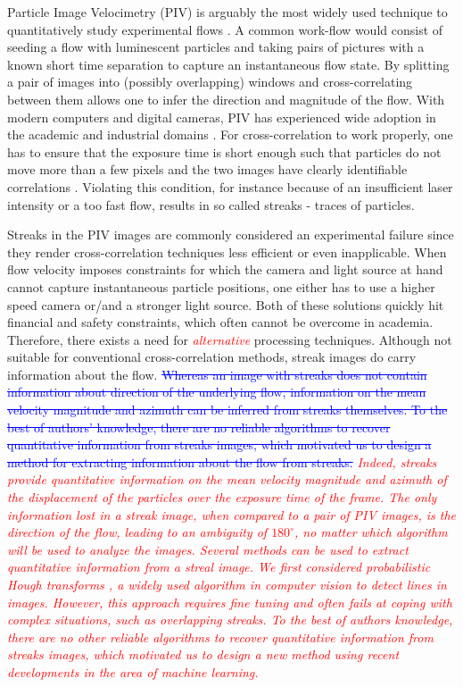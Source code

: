 \documentclass{svjour3}                     %
\newcommand{\new}[1]{\textit{\textcolor{red}{#1}}}
\newcommand{\old}[1]{\textcolor{blue}{\sout{#1}}}
\begin{document}
Particle Image Velocimetry (PIV) is arguably the most widely used technique to quantitatively study experimental flows \cite{westerweel1997fundamentals, raffel2018particle}. A common work-flow would consist of seeding a flow with luminescent particles and taking pairs of pictures with a known short time separation to capture an instantaneous flow state. By splitting a pair of images into (possibly overlapping) windows and cross-correlating between them allows one to infer the direction and magnitude of the flow. With modern computers and digital cameras, PIV has experienced wide adoption in the academic and industrial domains \cite{tropea2007springer}.
For cross-correlation to work properly, one has to ensure that the exposure time is short enough such that particles do not move more than a few pixels and the two images have clearly identifiable correlations \cite{westerweel1997fundamentals}. Violating this condition, for instance because of an insufficient laser intensity or a too fast flow, results in so called streaks - traces of particles.

Streaks in the PIV images are commonly considered an experimental failure since they render cross-correlation techniques less efficient or even inapplicable. When flow velocity imposes constraints for which the camera and light source at hand cannot capture instantaneous particle positions, one either has to use a higher speed camera or/and a stronger light source. Both of these solutions quickly hit financial and safety constraints, which often cannot be overcome in academia. Therefore, there exists a need for \new{alternative} processing techniques.
Although not suitable for conventional cross-correlation methods, streak images do carry information about the flow. \old{Whereas an image with streaks does not contain information about direction of the underlying flow, information on the mean velocity magnitude and azimuth can be inferred from streaks themselves. To the best of authors' knowledge, there are no reliable algorithms to recover quantitative information from streaks images, which motivated us to design a method for extracting information about the flow from streaks.} \new{Indeed, streaks provide quantitative information on the mean velocity magnitude and azimuth of the displacement of the particles over the exposure time of the frame. The only information lost in a streak image, when compared to a pair of PIV images, is the direction of the flow, leading to an ambiguity of $180^{\circ}$, no matter which algorithm will be used to analyze the images. Several methods can be used to extract quantitative information from a streal image. We first considered probabilistic Hough transforms \citep{galamhos1999}, a widely used algorithm in computer vision to detect lines in images. However, this approach requires fine tuning and often fails at coping with complex situations, such as overlapping streaks. To the best of authors knowledge, there are no other reliable algorithms to recover quantitative information from streaks images, which motivated us to design a new method using recent developments in the area of machine learning.}
\end{document}
